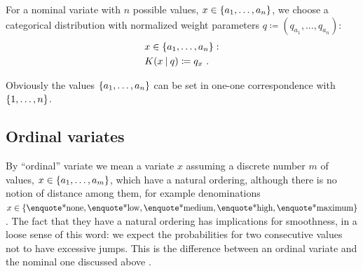 \documentclass[\ifafour a4paper,12pt,\else a5paper,10pt,\fi%
onecolumn,oneside,article,%
british%
]{memoir}
\makeatletter
\theoremstyle{remark}
\theoremstyle{innote}
\def\sum{\DOTSI\sumop\slimits@}
\newcommand*{\delt}{\deltaup}%
\newcommand*{\defd}{\coloneqq}
\DeclarePairedDelimiter\set{\{}{\}} %
\renewcommand*{\|}[1][]{\nonscript\:#1\vert\nonscript\:\mathopen{}}
\newcommand*{\mo}[1][=]{\mathord{\,#1\,}}
\newcommand*{\cf}{{cf.}}
\makeatother
\begin{document}
For a nominal variate with $n$ possible values, $x \in \set{a_{1}, \dotsc, a_{n}}$, we choose a categorical distribution with normalized weight parameters $q \defd (q_{a_1}, \dotsc, q_{a_n})$:
\begin{equation}
  \label{eq:K_cat}
  \begin{split}
    &x \in \set{a_{1}, \dotsc, a_{n}}:
    \\
  &K(x \| q) \defd q_{x} \ .%
\end{split}
\end{equation}

Obviously the values $\set{a_{1}, \dotsc, a_{n}}$ can be set in one-one correspondence with $\set{1, \dotsc, n}$.

\subsection{Ordinal variates}
\label{sec:variates_ordinal}

By \enquote{ordinal} variate we mean a variate $x$ assuming a discrete number $m$ of values, $x \in \set{a_{1}, \dotsc, a_{m}}$, which have a natural ordering, although there is no notion of distance among them, for example denominations $x \in \set{\text{\enquote*{none}}, \text{\enquote*{low}}, \text{\enquote*{medium}}, \text{\enquote*{high}}, \text{\enquote*{maximum}}}$. The fact that they have a natural ordering has implications for smoothness, in a loose sense of this word: we expect the probabilities for two consecutive values not to have excessive jumps. This is the difference between an ordinal variate and the nominal one discussed above \autocites[\cf]{stevens1946}.
\end{document}
